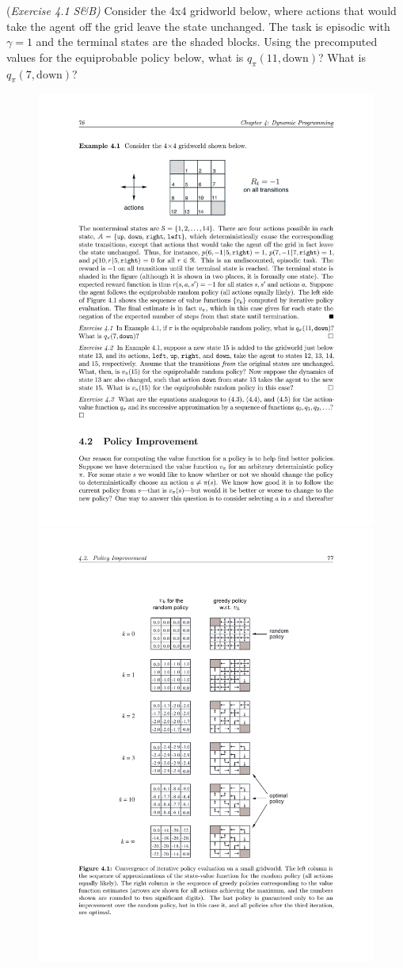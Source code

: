 (\textit{Exercise 4.1 S\&B)}
Consider the 4x4 gridworld below, where actions that
would take the agent off the grid leave the state unchanged.
The task is episodic with $\gamma =1$ and the terminal states are the
shaded blocks.
Using the precomputed values for the equiprobable policy below,
what is $q_\pi(11,\mbox{down})$?
What is $q_{\pi}(7,\mbox{down})$?

\begin{figure}[h!]
  \center
\includegraphics[width=0.65\linewidth]{figures/figure_4dot1_top.pdf}\\
\includegraphics[width=0.9\linewidth]{figures/figure_4dot1_bottom.pdf}
\end{figure}
